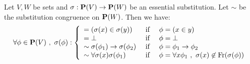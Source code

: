 \begin{prop}\label{logic:prop:FOPL:esssubstprop:charac}
Let $V,W$ be sets and $\sigma:\mbox{${\bf P}(V)$}\to{\bf P}(W)$ be an essential
substitution. Let $\sim$ be the substitution congruence on ${\bf
P}(W)$. Then we have:
    \[
    \forall\phi\in\pv\ ,\ \sigma(\phi):\left\{
                    \begin{array}{lcl}
                    =(\sigma(x)\in \sigma(y))&\mbox{\ if\ }&\phi=(x\in y)\\
                    =\bot&\mbox{\ if\ }&\phi=\bot\\
                    \sim\sigma(\phi_{1})\to\sigma(\phi_{2})&\mbox{\ if\ }&
                    \phi=\phi_{1}\to\phi_{2}\\
                    \sim\forall\sigma(x)\sigma(\phi_{1})
                    &\mbox{\ if\ }&\phi=\forall x\phi_{1}\ ,\
                    \sigma(x)\not\in\free(\sigma(\phi))\\
                    \end{array}\right.
    \]
\end{prop}
